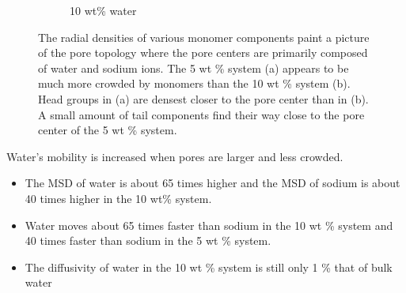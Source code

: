 \documentclass{article}
\begin{document}
\begin{figure}[!htb]
\begin{subfigure}{0.45\textwidth}
  \caption{10 wt\% water}\label{fig:component_density_10wt}
  \end{subfigure}
  \caption{The radial densities of various monomer components paint a picture of the
  pore topology where the pore centers are primarily composed of water and sodium ions.
  The 5 wt \% system (a) appears to be much more crowded by monomers than the 
  10 wt \% system (b). Head groups in (a) are densest closer to the pore center than
  in (b). A small amount of tail components find their way close to the pore center 
  of the 5 wt \% system. }\label{fig:component_densities}
  \end{figure}
  
  \noindent Water's mobility is increased when pores are larger and less crowded.
  \begin{itemize}
    \item The MSD of water is about 65 times higher and the MSD of sodium is about 40
    times higher in the 10 wt\% system.
    \item Water moves about 65 times faster than sodium in the 10 wt \% system and
    40 times faster than sodium in the 5 wt \% system. %
    \item The diffusivity of water in the 10 wt \% system is still only 1 \% that of 
    bulk water %
  \end{itemize}
  
  
  
\end{document}
